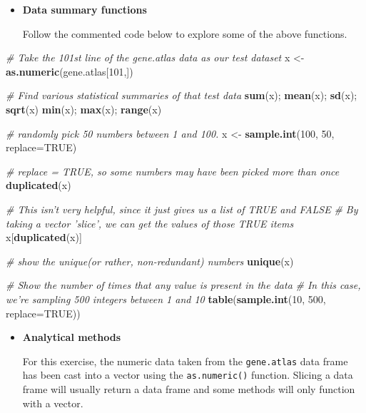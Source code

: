 \documentclass[a4paper]{book}
\newenvironment{Shaded}{\begin{snugshade}}{\end{snugshade}}
\newcommand{\KeywordTok}[1]{\textcolor[rgb]{0.13,0.29,0.53}{\textbf{{#1}}}}
\newcommand{\DataTypeTok}[1]{\textcolor[rgb]{0.13,0.29,0.53}{{#1}}}
\newcommand{\DecValTok}[1]{\textcolor[rgb]{0.00,0.00,0.81}{{#1}}}
\newcommand{\StringTok}[1]{\textcolor[rgb]{0.31,0.60,0.02}{{#1}}}
\newcommand{\CommentTok}[1]{\textcolor[rgb]{0.56,0.35,0.01}{\textit{{#1}}}}
\newcommand{\OtherTok}[1]{\textcolor[rgb]{0.56,0.35,0.01}{{#1}}}
\newcommand{\NormalTok}[1]{{#1}}
\renewenvironment{Shaded}
{\vspace{1.5em}\begin{leftbar}\begin{snugshade}}
{\end{snugshade}\end{leftbar}\vspace{3pt}}
\newenvironment{rmdblock}[1]
  {\vspace{1.5em}\begin{shaded*}
  \begin{itemize}
  \renewcommand{\labelitemi}{
    \raisebox{-.7\height}[0pt][0pt]{
      {\setkeys{Gin}{width=3em,keepaspectratio}\texttt{[image: images/\#1]}}
    }
  }
  \item
  }
  {
  \end{itemize}
  \end{shaded*}
  }
\newenvironment{rmdtip}
  {\begin{rmdblock}{tip}}
  {\end{rmdblock}}
\newenvironment{rmdexercise}
  {\begin{rmdblock}{exercise}}
  {\end{rmdblock}}
\begin{document}
\begin{rmdexercise}
\textbf{Data summary functions}

Follow the commented code below to explore some of the above functions.
\end{rmdexercise}

\begin{Shaded}
\begin{Highlighting}[]
\CommentTok{# Take the 101st line of the gene.atlas data as our test dataset}
\NormalTok{x <-}\StringTok{ }\KeywordTok{as.numeric}\NormalTok{(gene.atlas[}\DecValTok{101}\NormalTok{,])}

\CommentTok{# Find various statistical summaries of that test data}
\KeywordTok{sum}\NormalTok{(x); }\KeywordTok{mean}\NormalTok{(x); }\KeywordTok{sd}\NormalTok{(x); }\KeywordTok{sqrt}\NormalTok{(x)}
\KeywordTok{min}\NormalTok{(x); }\KeywordTok{max}\NormalTok{(x); }\KeywordTok{range}\NormalTok{(x)}

\CommentTok{# randomly pick 50 numbers between 1 and 100.}
\NormalTok{x <-}\StringTok{ }\KeywordTok{sample.int}\NormalTok{(}\DecValTok{100}\NormalTok{, }\DecValTok{50}\NormalTok{, }\DataTypeTok{replace=}\OtherTok{TRUE}\NormalTok{)}

\CommentTok{# replace = TRUE, so some numbers may have been picked more than once}
\KeywordTok{duplicated}\NormalTok{(x)}

\CommentTok{# This isn't very helpful, since it just gives us a list of TRUE and FALSE}
\CommentTok{# By taking a vector 'slice', we can get the values of those TRUE items}
\NormalTok{x[}\KeywordTok{duplicated}\NormalTok{(x)]}

\CommentTok{# show the unique(or rather, non-redundant) numbers}
\KeywordTok{unique}\NormalTok{(x)}

\CommentTok{# Show the number of times that any value is present in the data}
\CommentTok{# In this case, we're sampling 500 integers between 1 and 10}
\KeywordTok{table}\NormalTok{(}\KeywordTok{sample.int}\NormalTok{(}\DecValTok{10}\NormalTok{, }\DecValTok{500}\NormalTok{, }\DataTypeTok{replace=}\OtherTok{TRUE}\NormalTok{))}
\end{Highlighting}
\end{Shaded}

\begin{rmdtip}
\textbf{Analytical methods}

For this exercise, the numeric data taken from the \texttt{gene.atlas}
data frame has been cast into a vector using the \texttt{as.numeric()}
function. Slicing a data frame will usually return a data frame and some
methods will only function with a vector.
\end{rmdtip}
\end{document}
